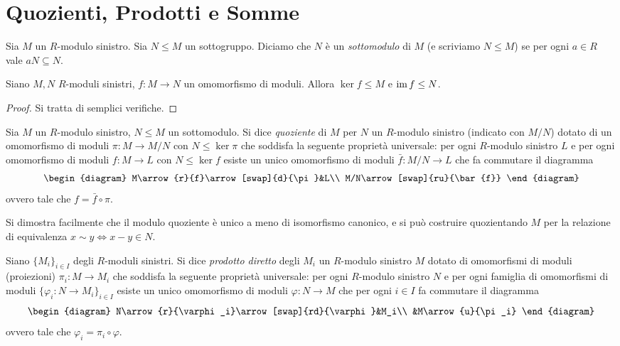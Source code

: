 \section{Quozienti, Prodotti e Somme}

\begin{definition}
Sia $M$ un $R$-modulo sinistro. Sia $N\le M$ un sottogruppo. Diciamo che $N$ è un \emph{sottomodulo} di $M$ (e scriviamo $N\le M$) se per ogni $a\in R$ vale $aN\subseteq N$.
\end{definition}

\begin{proposition}
Siano $M,N$ $R$-moduli sinistri, $f:M\to N$ un omomorfismo di moduli. Allora $\ker f\le M$ e $\operatorname{im} f\le N$.
\end{proposition}
\begin{proof}
Si tratta di semplici verifiche.
\end{proof}

\begin{definition}
Sia $M$ un $R$-modulo sinistro, $N\le M$ un sottomodulo. Si dice \emph{quoziente} di $M$ per $N$ un $R$-modulo sinistro (indicato con $M/N$) dotato di un omomorfismo di moduli $\pi:M\to M/N$ con $N\le\ker\pi$ che soddisfa la seguente proprietà universale: per ogni $R$-modulo sinistro $L$ e per ogni omomorfismo di moduli $f:M\to L$ con $N\le\ker f$ esiste un unico omomorfismo di moduli $\bar{f}:M/N\to L$ che fa commutare il diagramma
$$
\begin{diagram}
M\arrow{r}{f}\arrow[swap]{d}{\pi}&L\\
M/N\arrow[swap]{ru}{\bar{f}}
\end{diagram}
$$
ovvero tale che $f=\bar{f}\circ\pi$.
\end{definition}

Si dimostra facilmente che il modulo quoziente è unico a meno di isomorfismo canonico, e si può costruire quozientando $M$ per la relazione di equivalenza $x\sim y\iff x-y\in N$.

\begin{definition}
Siano $\{M_i\}_{i\in I}$ degli $R$-moduli sinistri. Si dice \emph{prodotto diretto} degli $M_i$ un $R$-modulo sinistro $M$ dotato di omomorfismi di moduli (proiezioni) $\pi_i:M\to M_i$ che soddisfa la seguente proprietà universale: per ogni $R$-modulo sinistro $N$ e per ogni famiglia di omomorfismi di moduli $\{\varphi_i:N\to M_i\}_{i\in I}$ esiste un unico omomorfismo di moduli $\varphi:N\to M$ che per ogni $i\in I$ fa commutare il diagramma
$$
\begin{diagram}
N\arrow{r}{\varphi_i}\arrow[swap]{rd}{\varphi}&M_i\\
&M\arrow{u}{\pi_i}
\end{diagram}
$$
ovvero tale che $\varphi_i=\pi_i\circ\varphi$.
\end{definition}

